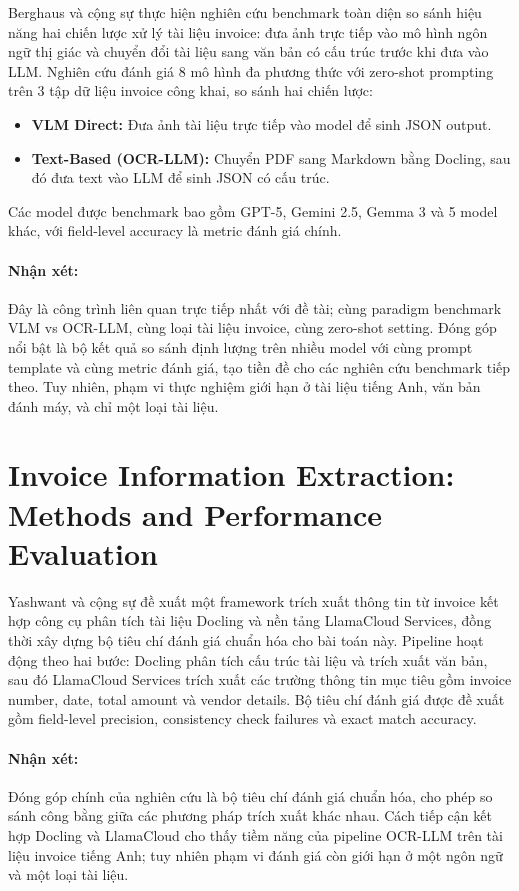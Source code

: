 ﻿\documentclass[12pt]{report}
\begin{document}
Berghaus và cộng sự \cite{berghaus2025invoice} thực hiện nghiên cứu benchmark toàn diện so sánh hiệu năng hai chiến lược xử lý tài liệu invoice: đưa ảnh trực tiếp vào mô hình ngôn ngữ thị giác và chuyển đổi tài liệu sang văn bản có cấu trúc trước khi đưa vào LLM. Nghiên cứu đánh giá 8 mô hình đa phương thức với zero-shot prompting trên 3 tập dữ liệu invoice công khai, so sánh hai chiến lược:
\begin{itemize}
    \item \textbf{VLM Direct:} Đưa ảnh tài liệu trực tiếp vào model để sinh JSON output.
    \item \textbf{Text-Based (OCR-LLM):} Chuyển PDF sang Markdown bằng Docling, sau đó đưa text vào LLM để sinh JSON có cấu trúc.
\end{itemize}
Các model được benchmark bao gồm GPT-5, Gemini 2.5, Gemma 3 và 5 model khác, với field-level accuracy là metric đánh giá chính.

\paragraph{Nhận xét:}
Đây là công trình liên quan trực tiếp nhất với đề tài; cùng paradigm benchmark VLM vs OCR-LLM, cùng loại tài liệu invoice, cùng zero-shot setting. Đóng góp nổi bật là bộ kết quả so sánh định lượng trên nhiều model với cùng prompt template và cùng metric đánh giá, tạo tiền đề cho các nghiên cứu benchmark tiếp theo. Tuy nhiên, phạm vi thực nghiệm giới hạn ở tài liệu tiếng Anh, văn bản đánh máy, và chỉ một loại tài liệu.

\section[Invoice Information Extraction]{Invoice Information Extraction: Methods and Performance Evaluation}\label{sec:rw_yashwant}

Yashwant và cộng sự \cite{yashwant2025invoice} đề xuất một framework trích xuất thông tin từ invoice kết hợp công cụ phân tích tài liệu Docling và nền tảng LlamaCloud Services, đồng thời xây dựng bộ tiêu chí đánh giá chuẩn hóa cho bài toán này. Pipeline hoạt động theo hai bước: Docling phân tích cấu trúc tài liệu và trích xuất văn bản, sau đó LlamaCloud Services trích xuất các trường thông tin mục tiêu gồm invoice number, date, total amount và vendor details. Bộ tiêu chí đánh giá được đề xuất gồm field-level precision, consistency check failures và exact match accuracy.

\paragraph{Nhận xét:}
Đóng góp chính của nghiên cứu là bộ tiêu chí đánh giá chuẩn hóa, cho phép so sánh công bằng giữa các phương pháp trích xuất khác nhau. Cách tiếp cận kết hợp Docling và LlamaCloud cho thấy tiềm năng của pipeline OCR-LLM trên tài liệu invoice tiếng Anh; tuy nhiên phạm vi đánh giá còn giới hạn ở một ngôn ngữ và một loại tài liệu.
\end{document}
